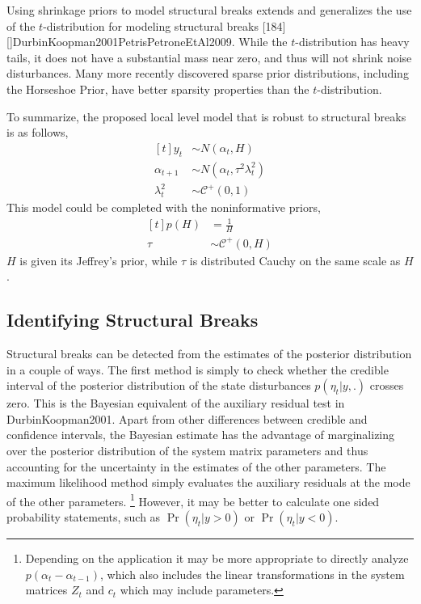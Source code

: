 \documentclass{article}
\newcommand{\dist}[1]{\mathcal{#1}}
\newcommand{\paren}[1]{\ensuremath{\left(#1\right)}}
\newcommand{\dhalfcauchy}[1]{\ensuremath{\dist{C}^{+}\paren{#1}}}
\begin{document}
Using shrinkage priors to model structural breaks extends and generalizes the use of the $t$-distribution for modeling structural breaks \textcite{HarveyKoopman2000}[184][]{DurbinKoopman2001}{PetrisPetroneEtAl2009}.
While the $t$-distribution has heavy tails, it does not have a substantial mass near zero, and thus will not shrink noise disturbances.
Many more recently discovered sparse prior distributions, including the Horseshoe Prior, have better sparsity properties than the $t$-distribution.

To summarize, the proposed local level model that is robust to structural breaks is as follows,
\begin{equation}
  \label{eq:10}
  \begin{aligned}[t]
    y_{t} &\sim N(\alpha_{t}, H) \\
    \alpha_{t + 1} &\sim N(\alpha_{t}, \tau^{2} \lambda^{2}_{t}) \\
    \lambda^{2}_{t} & \sim \dhalfcauchy{0, 1}
  \end{aligned}
\end{equation}
This model could be completed with the noninformative priors,
\begin{equation}
  \label{eq:7}
  \begin{aligned}[t]
    p(H) &= \frac{1}{H} \\
    \tau &\sim \dhalfcauchy{0, H}
  \end{aligned}
\end{equation}
$H$ is given its Jeffrey's prior, while $\tau$ is distributed Cauchy
on the same scale as $H$.


\subsection{Identifying Structural Breaks}

Structural breaks can be detected from the estimates of the  posterior distribution in a couple of ways.
The first method is simply to check whether the credible interval of the posterior distribution of the state disturbances $p(\eta_{t} | y, .)$ crosses zero.
This is the Bayesian equivalent of the auxiliary residual test in \textcite{JongPenzer1998}{DurbinKoopman2001}.%
Apart from other differences between credible and confidence intervals, the Bayesian estimate has the advantage of marginalizing over the posterior distribution of the system matrix parameters and thus accounting for the  uncertainty in the estimates of the other parameters.
The maximum likelihood method simply evaluates the auxiliary residuals at the mode of the other parameters.%
\footnote{Depending on the application it may be more appropriate to directly analyze $p(\alpha_{t} - \alpha_{t-1})$, which also includes the linear transformations in the system matrices $Z_{t}$ and $c_{t}$ which may include parameters.}
However, it may be better to calculate one sided probability statements, such as $\Pr(\eta_{t} | y > 0)$ or $\Pr(\eta_{t} | y <0)$.
\end{document}
